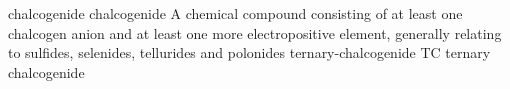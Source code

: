 \newglsXterm%
{chalcogenide}%
{chalcogenide}%
{A chemical compound consisting of at least one chalcogen anion and at least one more electropositive element, generally relating to sulfides, selenides, tellurides and polonides}%
\newglsXacronym%
{ternary-chalcogenide}%
{TC}%
{ternary chalcogenide}%
